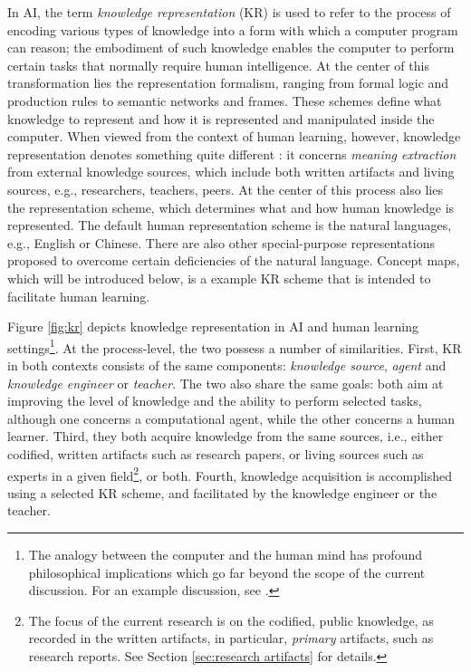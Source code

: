 In AI, the term {\it knowledge representation\/} (KR) is used to refer to
the process of encoding various types of knowledge into a form with which a
computer program can reason; the embodiment of such knowledge enables the
computer to perform certain tasks that normally require human intelligence.
At the center of this transformation lies the representation formalism,
ranging from formal logic and production rules to semantic networks and
frames. These schemes define what knowledge to represent and how it is
represented and manipulated inside the computer. When viewed from the
context of human learning, however, knowledge representation denotes
something quite different : it concerns {\it meaning extraction\/} from
external knowledge sources, which include both written artifacts and living
sources, e.g., researchers, teachers, peers. At the center of this process
also lies the representation scheme, which determines what and how human
knowledge is represented. The default human representation scheme is the
natural languages, e.g., English or Chinese. There are also other
special-purpose representations proposed to overcome certain deficiencies
of the natural language. Concept maps, which will be introduced below, is a
example KR scheme that is intended to facilitate human learning.

Figure \ref{fig:kr} depicts knowledge representation in AI and human
learning settings\footnote{The analogy between the computer and the human mind
has profound philosophical implications which go far beyond the scope of
the current discussion. For an example discussion, see \cite{Harnad89}.}.
At the process-level, the two possess a number of similarities. First, KR
in both contexts consists of the same components: {\it knowledge source\/},
{\it agent\/} and {\it knowledge engineer\/} or {\it teacher\/}.  The two
also share the same goals: both aim at improving the level of knowledge and
the ability to perform selected tasks, although one concerns a
computational agent, while the other concerns a human learner. Third, they
both acquire knowledge from the same sources, i.e., either codified,
written artifacts such as research papers, or living sources such as
experts in a given field\footnote{The focus of the current research is on the
codified, public knowledge, as recorded in the written artifacts, in
particular, {\it primary\/} artifacts, such as research reports. See
Section \ref{sec:research artifacts} for details.}, or both.  Fourth,
knowledge acquisition is accomplished using a selected KR scheme, and
facilitated by the knowledge engineer or the teacher.

